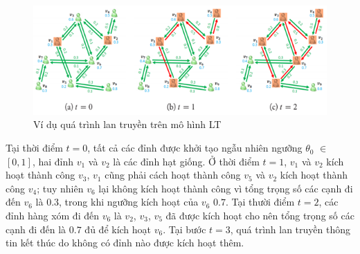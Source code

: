 	\begin{center}
		\begin{figure}[H]
			\begin{center}
				\includegraphics [scale=1]{picture/Hinh2_2}
			\end{center}
			\caption{Ví dụ quá trình lan truyền trên mô hình LT}
			\label{refhinh2_2}
		\end{figure}
	\end{center}	
	Tại thời điểm $t$$=$$0$, tất cả các đỉnh được khởi tạo ngẫu nhiên ngưỡng $\theta$$_{0}$ $\in$ $[0,1]$, hai đỉnh $v$$_{1}$ và $v$$_{2}$ là các đỉnh hạt giống. Ở thời điểm $t = 1$, $v$$_{1}$ và $v$$_{2}$ kích hoạt thành công $v$$_{3}$, $v$$_{1}$ cũng phải cách hoạt thành công $v$$_{5}$ và $v$$_{2}$ kích hoạt thành công $v$$_{4}$; tuy nhiên $v$$_{6}$ lại không kích hoạt thành công vì tổng trọng số các cạnh đi đến $v$$_{6}$ là $0.3$, trong khi ngưỡng kích hoạt của $v$$_{6}$ $0.7$. Tại thười điểm $t = 2$, các đỉnh hàng xóm đi đến $v$$_{6}$ là $v$$_{2}$, $v$$_{3}$, $v$$_{5}$ đã được kích hoạt cho nên tổng trọng số các cạnh đi đến là $0.7$ đủ để kích hoạt $v$$_{6}$. Tại bước $t = 3$, quá trình lan truyền thông tin kết thúc do không có đỉnh nào được kích hoạt thêm.

